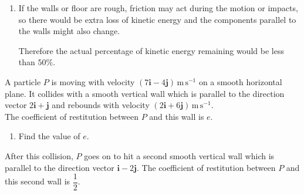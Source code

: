 \documentclass[leqno]{article}
\begin{document}
\begin{enumerate}[
  label=\textbf{\arabic*.},
  leftmargin=*,
  topsep=0pt,
  partopsep=0pt,
  parsep=0pt
]
\begin{djsSolution}
\begin{enumerate}[label=\textbf{(\alph*)}]
  Now find the final speed.

  After the second impact, the components are
  \[
  \frac{u}{2\sqrt2}
  \quad\text{and}\quad
  \frac{\sqrt3}{2}\times \frac{u}{\sqrt2}
  =
  \frac{\sqrt3\,u}{2\sqrt2}
  \]

  Therefore
  \begin{align*}
  v^2
  &=\left(\frac{u}{2\sqrt2}\right)^2+\left(\frac{\sqrt3\,u}{2\sqrt2}\right)^2 \\
  &=\frac{u^2}{8}+\frac{3u^2}{8} \\
  &=\frac{u^2}{2}
  \end{align*}

  Initial kinetic energy:
  \[
  KE_{\text{before}}=\frac12 mu^2
  \]

  Final kinetic energy:
  \[
  KE_{\text{after}}=\frac12 m v^2=\frac12 m\left(\frac{u^2}{2}\right)=\frac14 mu^2
  \]

  So
  \[
  \frac{KE_{\text{after}}}{KE_{\text{before}}}
  =
  \frac{\frac14 mu^2}{\frac12 mu^2}
  =
  \frac12
  \]

  Hence the final kinetic energy is \(50\%\) of the initial kinetic energy.

  \item If the walls or floor are rough, friction may act during the motion or impacts, so there would be extra loss of kinetic energy and the components parallel to the walls might also change.

  Therefore the actual percentage of kinetic energy remaining would be less than \(50\%\).
\end{enumerate}
\end{djsSolution}


\newpage

\questionitem

A particle $P$ is moving with velocity $(7\mathbf{i}-4\mathbf{j})\,\mathrm{m\,s^{-1}}$ on a smooth horizontal plane. It collides with a smooth vertical wall which is parallel to the direction vector $2\mathbf{i}+\mathbf{j}$ and rebounds with velocity $(2\mathbf{i}+6\mathbf{j})\,\mathrm{m\,s^{-1}}$. \\

The coefficient of restitution between $P$ and this wall is $e$. \\

\begin{enumerate}[label=\textbf{(\alph*)}]
  \item Find the value of $e$.  \\
\end{enumerate}
After this collision, $P$ goes on to hit a second smooth vertical wall which is parallel to the direction vector $\mathbf{i}-2\mathbf{j}$. The coefficient of restitution between $P$ and this second wall is $\dfrac{1}{2}$. \\


\end{enumerate}
\end{document}
